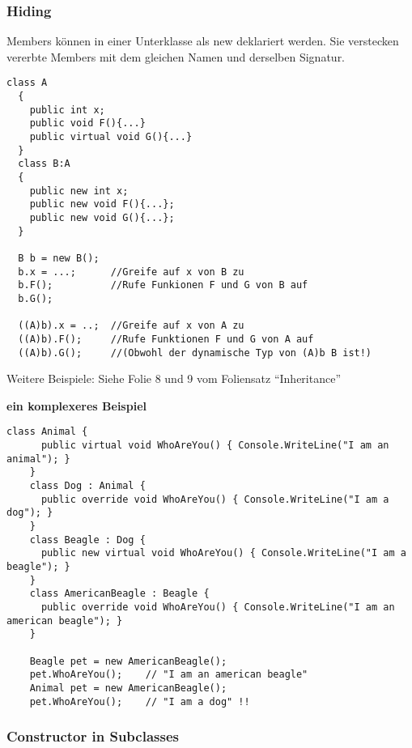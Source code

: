 \subsubsection{Hiding}
Members können in einer Unterklasse als new deklariert werden. Sie verstecken
vererbte Members mit dem gleichen Namen und derselben Signatur. 
\begin{lstlisting}[style=Csharp]
  class A
  {
    public int x; 
    public void F(){...}
    public virtual void G(){...}
  }
  class B:A
  {
    public new int x; 
    public new void F(){...};
    public new void G(){...};
  }
  
  B b = new B(); 
  b.x = ...;      //Greife auf x von B zu 
  b.F();          //Rufe Funkionen F und G von B auf
  b.G(); 
  
  ((A)b).x = ..;  //Greife auf x von A zu
  ((A)b).F();     //Rufe Funktionen F und G von A auf
  ((A)b).G();     //(Obwohl der dynamische Typ von (A)b B ist!)
\end{lstlisting}
Weitere Beispiele: Siehe Folie 8 und 9 vom Foliensatz "`Inheritance"'

\textbf{ein komplexeres Beispiel}
\begin{lstlisting}[style=Csharp]
	class Animal {
	  public virtual void WhoAreYou() { Console.WriteLine("I am an animal"); }
	}
	class Dog : Animal {
	  public override void WhoAreYou() { Console.WriteLine("I am a dog"); }
	}
	class Beagle : Dog {
	  public new virtual void WhoAreYou() { Console.WriteLine("I am a beagle"); }
	}
	class AmericanBeagle : Beagle {
	  public override void WhoAreYou() { Console.WriteLine("I am an american beagle"); }
	}
	
	Beagle pet = new AmericanBeagle();
	pet.WhoAreYou();	// "I am an american beagle"
	Animal pet = new AmericanBeagle();
	pet.WhoAreYou(); 	// "I am a dog" !!
\end{lstlisting}

\subsubsection{Constructor in Subclasses}

